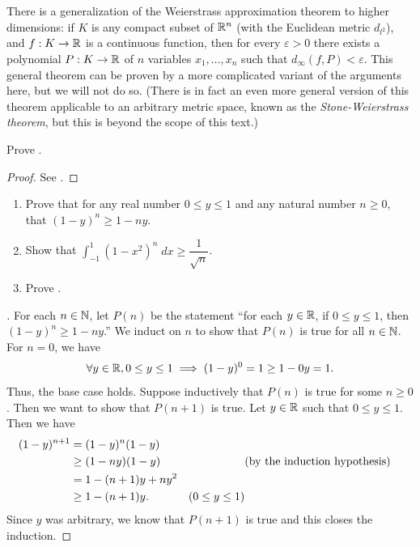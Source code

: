 \begin{rmk}\label{ii:3.8.21}
  There is a generalization of the Weierstrass approximation theorem to higher dimensions:
  if \(K\) is any compact subset of \(\mathbb{R}^n\) (with the Euclidean metric \(d_{l^2}\)), and \(f : K \to \mathbb{R}\) is a continuous function, then for every \(\varepsilon > 0\) there exists a polynomial \(P : K \to \mathbb{R}\) of \(n\) variables \(x_1, \dots, x_n\) such that \(d_\infty(f, P) < \varepsilon\).
  This general theorem can be proven by a more complicated variant of the arguments here, but we will not do so.
  (There is in fact an even more general version of this theorem applicable to an arbitrary metric space, known as the \emph{Stone-Weierstrass theorem}, but this is beyond the scope of this text.)
\end{rmk}

\exercisesection

\begin{ex}\label{ii:ex:3.8.1}
  Prove .
\end{ex}

\begin{proof}
  See .
\end{proof}

\begin{ex}\label{ii:ex:3.8.2}
  \quad
  \begin{enumerate}
    \item\label{ii:ex:3.8.2.a} Prove that for any real number \(0 \leq y \leq 1\) and any natural number \(n \geq 0\), that \((1 - y)^n \geq 1 - ny\).
    \item\label{ii:ex:3.8.2.b} Show that \(\int_{-1}^1 (1 - x^2)^n \; dx \geq \dfrac{1}{\sqrt{n}}\).
    \item\label{ii:ex:3.8.2.c} Prove .
  \end{enumerate}
\end{ex}

\begin{proof}[]
  For each \(n \in \mathbb{N}\), let \(P(n)\) be the statement ``for each \(y \in \mathbb{R}\), if \(0 \leq y \leq 1\), then \((1 - y)^n \geq 1 - ny\).''
  We induct on \(n\) to show that \(P(n)\) is true for all \(n \in \mathbb{N}\).
  For \(n = 0\), we have
  \[
    \forall y \in \mathbb{R}, 0 \leq y \leq 1 \implies (1 - y)^0 = 1 \geq 1 - 0y = 1.
  \]
  Thus, the base case holds.
  Suppose inductively that \(P(n)\) is true for some \(n \geq 0\).
  Then we want to show that \(P(n + 1)\) is true.
  Let \(y \in \mathbb{R}\) such that \(0 \leq y \leq 1\).
  Then we have
  \begin{align*}
    (1 - y)^{n + 1} & = (1 - y)^n (1 - y)                                \\
                    & \geq (1 - ny) (1 - y)  &                   & \text{(by the induction hypothesis)} \\
                    & = 1 - (n + 1)y + n y^2                             \\
                    & \geq 1 - (n + 1)y.     & (0 \leq y \leq 1)
  \end{align*}
  Since \(y\) was arbitrary, we know that \(P(n + 1)\) is true and this closes the induction.
\end{proof}

